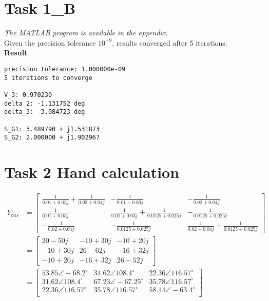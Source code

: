 \documentclass{article}
\begin{document}
\newpage


\section*{Task 1\_B}
\textit{The MATLAB program is available in the appendix.}\\

Given the precision tolerance $10^{-9}$, results converged after 5 iterations.\\

\textbf{Result}
\begin{lstlisting}[language={}]
precision tolerance: 1.000000e-09
5 iterations to converge

V_3: 0.970230
delta_2: -1.131752 deg
delta_3: -3.084723 deg

S_G1: 3.489790 + j1.531873
S_G2: 2.000000 + j1.902967
\end{lstlisting}


\section*{Task 2 Hand calculation}

\begin{align*}
Y_{bus} &= 
\begin{bmatrix}
\frac{1}{0.01+0.03j} + \frac{1}{0.02+0.04j} &-\frac{1}{0.01+0.03j} &-\frac{1}{0.02+0.04j}\\
\frac{1}{0.01+0.03j} &\frac{1}{0.01+0.03j} + \frac{1}{0.0125+0.025j} &-\frac{1}{0.0125+0.025j}\\
-\frac{1}{0.02+0.04j} &-\frac{1}{0.0125+0.025j} &\frac{1}{0.02+0.04j} + \frac{1}{0.0125+0.025j}
\end{bmatrix}\\
&=
\begin{bmatrix}
20-50j &-10+30j &-10+20j\\
-10+30j &26-62j &-16+32j\\
-10+20j &-16+32j &26-52j
\end{bmatrix}\\
&=
\begin{bmatrix}
53.85 \angle -68.2^{\circ} &31.62 \angle 108.4^{\circ} &22.36 \angle 116.57^{\circ}\\
31.62 \angle 108.4^{\circ} &67.23 \angle -67.25^{\circ} &35.78 \angle 116.57^{\circ}\\
22.36 \angle 116.57^{\circ} &35.78 \angle 116.57^{\circ} &58.14 \angle -63.4^{\circ}\\
\end{bmatrix}
\end{align*}
\end{document}
